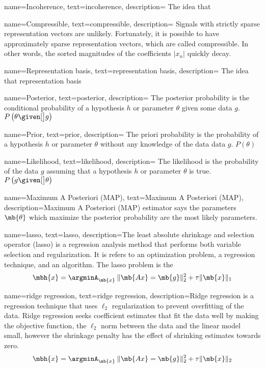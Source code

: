 {
name={Incoherence},
text={incoherence},
description={ The idea that }
}

{
name={Compressible},
text={compressible},
description={ Signals with strictly sparse representation vectors are unlikely. Fortunately, it is possible to have approximately sparse representation vectors, which are called compressible. In other words, the sorted magnitudes of the coefficients $|x_n|$ quickly decay.}
}

{
name={Representation basis},
text={representation basis},
description={ The idea that representation basis}
}

{
name={Posterior},
text={posterior},
description={ The posterior probability is the conditional probability of a hypothesis $h$ or parameter $\theta$ given some data $g$. $ P \left( \theta \given[\big] g \right) $}
}

{
name={Prior},
text={prior},
description={ The priori probability is the probability of a hypothesis $h$ or parameter $\theta$ without any knowledge of the data data $g$. $ P \left( \theta \right) $}
}

{
name={Likelihood},
text={likelihood},
description={ The likelihood is the probability of the data $g$ assuming that a hypothesis $h$ or parameter $\theta$ is true. $P \left( g \given[\big] \theta \right)$}
}

{
name={Maximum A Posteriori (MAP)},
text={Maximum A Posteriori (MAP)},
description={Maximum A Posteriori (MAP) estimator says the parameters  $ \mb{\theta} $ which maximize the \gls{posterior} probability are the most likely parameters.}
}

{
name={lasso},
text={lasso},
description={The least absolute shrinkage and selection operator (lasso) is a regression analysis method that performs both variable selection and regularization. It is refers to an optimization problem, a regression technique, and an algorithm. The lasso problem is the
%
\begin{equation*}
	\mbh{x} = \argminA_{\mb{x}} \: \| \mb{Ax} = \mb{g} \|_{2}^{2} + \tau \| \mb{x} \|_1
\end{equation*}
 }
}

{
name={ridge regression},
text={ridge regression},
description={Ridge regression is a regression technique that uses $\ell_2$ regularization to prevent overfitting of the data. Ridge regression seeks coefficient estimates that fit the data well by making the objective function, the $\ell_2$ norm between the data and the linear model small, however the shrinkage penalty has the effect of shrinking estimates towards zero. 
%
\begin{equation*}
	\mbh{x} = \argminA_{\mb{x}} \: \| \mb{Ax} = \mb{g} \|_{2}^{2} + \tau \| \mb{x} \|_2
\end{equation*}
 }
}

